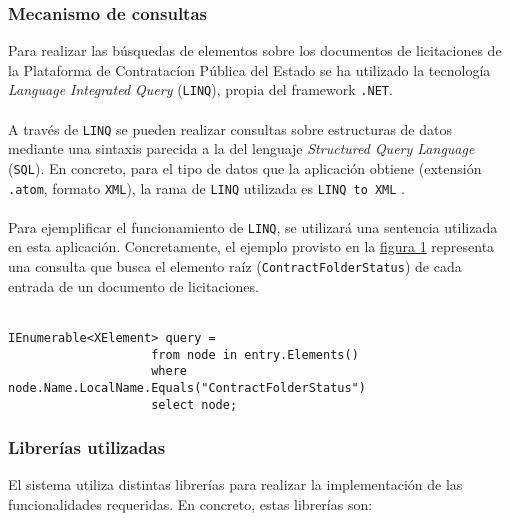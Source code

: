         \subsubsection{Mecanismo de consultas}
            Para realizar las búsquedas de elementos sobre los documentos de licitaciones de la Plataforma de Contratacíon Pública del Estado se ha utilizado la tecnología \textit{Language Integrated Query} (\texttt{LINQ}), propia del framework \texttt{.NET}.
            \\ \\
            A través de \texttt{LINQ} se pueden realizar consultas sobre estructuras de datos mediante una sintaxis parecida a la del lenguaje \textit{Structured Query Language} (\texttt{SQL}). En concreto, para el tipo de datos que la aplicación obtiene (extensión \texttt{.atom}, formato \texttt{XML}), la rama de \texttt{LINQ} utilizada es \texttt{LINQ to XML} \cite{LINQXML}.
            \\ \\
            Para ejemplificar el funcionamiento de \texttt{LINQ}, se utilizará una sentencia utilizada en esta aplicación. Concretamente, el ejemplo provisto en la \hyperref[fig:linq]{figura 1} representa una consulta que busca el elemento raíz (\texttt{ContractFolderStatus}) de cada entrada de un documento de licitaciones.
            \\ \\
            \begin{lstlisting}[language=lCSharp,gobble=14]
                IEnumerable<XElement> query =
                    from node in entry.Elements()
                    where node.Name.LocalName.Equals("ContractFolderStatus")
                    select node;
            \end{lstlisting}
            \label{fig:linq}
        
        \subsubsection{Librerías utilizadas}
            El sistema utiliza distintas librerías para realizar la implementación de las funcionalidades requeridas. En concreto, estas librerías son:
            
